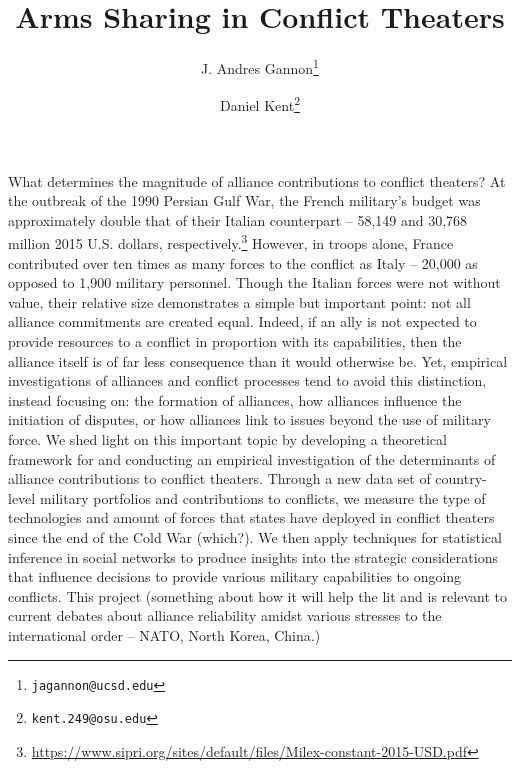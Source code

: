 \documentclass[12pt]{article}
\title{%
Arms Sharing in Conflict Theaters}
\author{
	J. Andres Gannon\footnote{\texttt{jagannon@ucsd.edu}}
	\and 
	Daniel Kent\footnote{\texttt{kent.249@osu.edu}}}
\begin{document}
\maketitle


What determines the magnitude of alliance contributions to conflict theaters?
At the outbreak of the 1990 Persian Gulf War, the French military's
budget was approximately double that of their Italian counterpart -- 58,149 and
30,768 million 2015 U.S. dollars,
respectively.\footnote{\url{https://www.sipri.org/sites/default/files/Milex-constant-2015-USD.pdf}}
However, in troops alone, France contributed over ten times as many
forces to the conflict as Italy -- 20,000 as opposed to 1,900 military
personnel. Though the Italian forces were not without value, their relative
size demonstrates a simple but important point: not all alliance
commitments are created equal.
Indeed, if an ally is not expected to provide resources
to a conflict in proportion with its capabilities, then the alliance
itself is of far less consequence than it would otherwise be.
Yet, empirical investigations of alliances and conflict processes tend
to avoid this distinction, instead focusing on: the formation of
alliances, how alliances influence the initiation of disputes, or how
alliances link to issues beyond the use of military force.
We shed light on this important topic by developing a
theoretical framework for and conducting an empirical investigation of
the determinants of alliance contributions to conflict theaters.
Through a new data set of country-level military portfolios and
contributions to conflicts, we measure the type of technologies and
amount of forces that states have deployed in conflict theaters since the
end of the Cold War (which?).%
We then apply techniques for statistical inference in social networks to produce
insights into the strategic considerations that influence decisions to
provide various military capabilities to ongoing conflicts.
This project (something about how it will help the lit and is
relevant to current debates about alliance reliability amidst various
stresses to the international order -- NATO, North Korea, China.)
\end{document}
